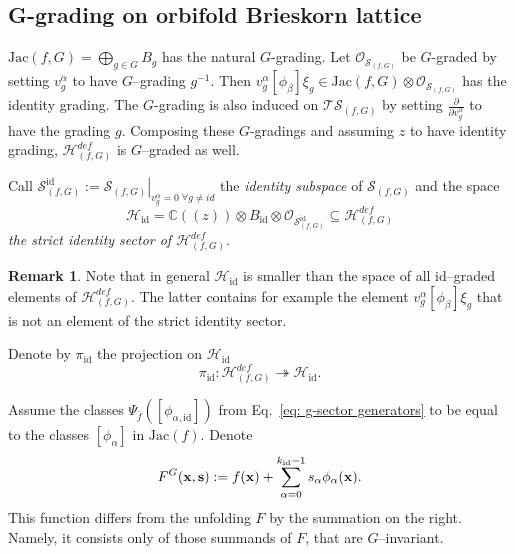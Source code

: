 \documentclass[reqno,12pt]{amsart}
\numberwithin{equation}{section}
\theoremstyle{plain}
\theoremstyle{definition}
\newtheorem{remark}[theorem]{Remark}
\newtheorem{definition}[theorem]{Definition}
\newcommand{\CC}{{\mathbb{C}}}
\newcommand{\Jac}{\mathrm{Jac}}
\newcommand{\id}{\mathrm{id}}
\newcommand{\bs}{{\bf s}}
\newcommand{\bx}{{\bf x}}
\def\H{{\mathcal H}}
\def\O{{\mathcal O}}
\def\T{{\mathcal T}}
\numberwithin{equation}{section}
\begin{document}
\subsection{G-grading on orbifold Brieskorn lattice}\label{section: BL G--grading}
$\Jac(f,G) = \bigoplus_{g \in G} B_g$ has the natural $G$-grading. 
Let $\O_{\mathcal{S}_{(f,G)}}$ be $G$-graded by setting $v^{\alpha}_{g}$ to have $G$--grading $g^{-1}$. Then $v^{\alpha}_{g}[\phi_\beta]\xi_g \in \Jac(f,G)\otimes \O_{\mathcal{S}_{(f,G)}}$ has the identity grading. The $G$-grading is also induced on $\T \mathcal{S}_{(f,G)}$ by setting $\frac{\partial}{\partial v^{\alpha}_{g}}$ to have the grading $g$. Composing these $G$-gradings and assuming $z$ to have identity grading, $\H^{def}_{(f,G)}$ is $G$--graded as well.

Call $\mathcal{S}^{\id}_{(f,G)} := \left.\mathcal{S}_{(f,G)}\right\vert_{v^\alpha_g=0\; \forall g \neq id}$ the \emph{identity subspace} of $\mathcal{S}_{(f,G)}$
and the space 
\[
    \H_{\id} = \CC((z)) \otimes B_\id \otimes \O_{\mathcal{S}^{\id}_{(f,G)}} \subseteq \H^{def}_{(f,G)} 
\]
\emph{the strict identity sector of $\H^{def}_{(f,G)}$}.

\begin{remark}\label{remark: strict and identity sectors}
Note that in general $\H_{\id}$ is smaller than the space of all $\id$--graded elements of $\H^{def}_{(f,G)}$. The latter contains for example the element $v_g^{\alpha} [\phi_\beta] \xi_g$ that is not an element of the strict identity sector.
\end{remark}

Denote by $\pi_\id$ the projection on $\H_{\id}$ 
\[
    \pi_\id: \H^{def}_{(f,G)} \twoheadrightarrow \H_{\id}.
\]

Assume the classes $\Psi_{\bar{f}}([\phi_{\alpha, \id}])$ from Eq.~\eqref{eq: g-sector generators} to be equal to the classes $[\phi_\alpha]$ in $\Jac(f)$.
Denote
\[
    F^G(\bx,\bs) := f(\bx) + \sum_{\alpha=0}^{k_\id-1} s_\alpha \phi_\alpha(\bx).
\]
This function differs from the unfolding $F$ by the summation on the right. Namely, it consists only of those summands of $F$, that are $G$--invariant.
\end{document}
